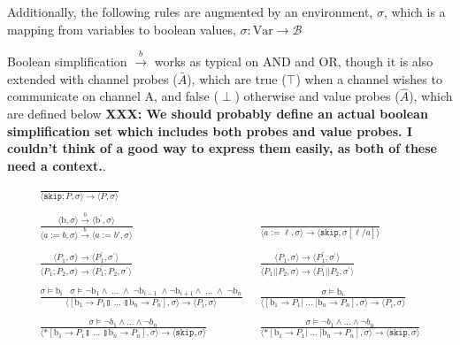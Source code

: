 \documentclass[times,10pt]{article}
\begin{document}
Additionally, the following rules are augmented by an environment, $\sigma$, which is a mapping from variables to boolean values, $\sigma : \textrm{Var} \rightarrow \mathcal{B}$ 

Boolean simplification $\overset{b}{\rightarrow}$ works as typical on AND and OR, though it is also extended with channel probes ($\bar{A}$), which are true  ($\top$) when a channel wishes to communicate on channel A, and false ($\perp$) otherwise and value probes ($\widehat{A}$), which are defined below \textbf{XXX: We should probably define an actual boolean simplification set which includes both probes and value probes.  I couldn't think of a good way to express them easily, as both of these need a context.}.

\begin{align*}
\frac{}{\langle \mathtt{skip}; P, \sigma \rangle \rightarrow \langle P, \sigma \rangle } & \\ \\
\frac{\langle \textrm{b}, \sigma \rangle \overset{b}{\rightarrow} \langle \textrm{b}^\prime, \sigma \rangle}{\langle a := b, \sigma\rangle \overset{b}{\rightarrow}  \langle a := b', \sigma \rangle} &\;\; 
\frac{}{\langle a := \ell, \sigma\rangle \rightarrow \langle \mathtt{skip}, \sigma[\ell/a] \rangle } \\ \\
\frac{\langle P_1, \sigma\rangle \rightarrow \langle P_1^\prime, \sigma^\prime\rangle }{\langle P_1; P_2, \sigma\rangle \rightarrow \langle P_1^\prime; P_2, \sigma^\prime\rangle} &
\;\; \frac{\langle P_1, \sigma\rangle \rightarrow \langle P_1^\prime, \sigma^\prime\rangle}{\langle P_1 || P_2, \sigma\rangle \rightarrow \langle P_1^\prime || P_2, \sigma^\prime\rangle} \\ \\
\frac{\sigma \models \textrm{b}_i \;\;\; \sigma \models \lnot \mathrm{b}_1 \wedge \; ... \; \wedge \; \lnot \mathrm{b}_{i-1} \; \wedge \lnot \mathrm{b}_{i+1} \wedge \; ... \; \wedge \; \lnot\mathrm{b}_n } {\langle [ \mathrm{b}_1 \rightarrow P_1  \talloblong \; ... \; \talloblong \mathrm{b}_n \rightarrow P_n ] , \sigma \rangle \rightarrow \langle P_i , \sigma\rangle  } &\;\;
 \frac{\sigma \models \textrm{b}_i} {\langle [ \mathrm{b}_1 \rightarrow P_1  | \; ... \; | \mathrm{b}_n \rightarrow P_n ] , \sigma \rangle \rightarrow \langle P_i , \sigma\rangle  } \\ \\
\frac{\sigma \models \lnot b_1 \wedge ... \wedge \lnot b_n}{\langle *[ \mathrm{b}_1 \rightarrow P_1  \talloblong \; ... \; \talloblong \mathrm{b}_n \rightarrow P_n ] , \sigma \rangle \rightarrow \langle \mathtt{skip} , \sigma\rangle } &\;\; 
\frac{\sigma \models \lnot b_1 \wedge ... \wedge \lnot b_n}{\langle *[ \mathrm{b}_1 \rightarrow P_1  | \; ... \; | \mathrm{b}_n \rightarrow P_n ] , \sigma \rangle \rightarrow \langle \mathtt{skip} , \sigma \rangle } 
\end{align*}
\end{document}

